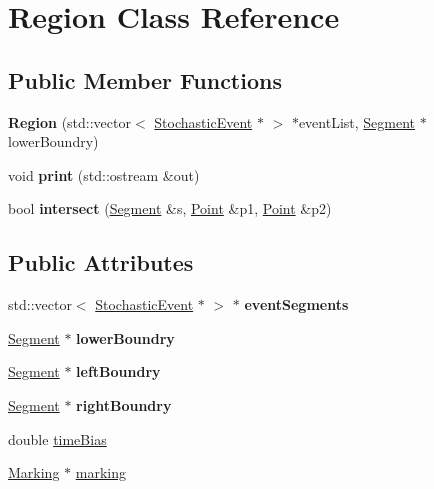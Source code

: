 \hypertarget{classRegion}{\section{Region Class Reference}
\label{classRegion}
}
\subsection*{Public Member Functions}
\begin{DoxyCompactItemize}
\item 
\hypertarget{classRegion_a41ba18a2fa719627ef1933d80876f622}{{\bfseries Region} (std\-::vector$<$ \hyperlink{structStochasticEvent}{Stochastic\-Event} $\ast$ $>$ $\ast$event\-List, \hyperlink{classSegment}{Segment} $\ast$lower\-Boundry)}\label{classRegion_a41ba18a2fa719627ef1933d80876f622}

\item 
\hypertarget{classRegion_a4b32e470e65d95d557129accb8cc5dd5}{void {\bfseries print} (std\-::ostream \&out)}\label{classRegion_a4b32e470e65d95d557129accb8cc5dd5}

\item 
\hypertarget{classRegion_a2d113c4b0cb61ceb1a469d1a8ecfbd1d}{bool {\bfseries intersect} (\hyperlink{classSegment}{Segment} \&s, \hyperlink{structPoint}{Point} \&p1, \hyperlink{structPoint}{Point} \&p2)}\label{classRegion_a2d113c4b0cb61ceb1a469d1a8ecfbd1d}

\end{DoxyCompactItemize}
\subsection*{Public Attributes}
\begin{DoxyCompactItemize}
\item 
\hypertarget{classRegion_a28c4bbed633b1e0795b75c765881152e}{std\-::vector$<$ \hyperlink{structStochasticEvent}{Stochastic\-Event} $\ast$ $>$ $\ast$ {\bfseries event\-Segments}}\label{classRegion_a28c4bbed633b1e0795b75c765881152e}

\item 
\hypertarget{classRegion_aec7eda0e18a1cc45b181e37002b43aa8}{\hyperlink{classSegment}{Segment} $\ast$ {\bfseries lower\-Boundry}}\label{classRegion_aec7eda0e18a1cc45b181e37002b43aa8}

\item 
\hypertarget{classRegion_ab67af47f2e4b0c139977abcfc5768750}{\hyperlink{classSegment}{Segment} $\ast$ {\bfseries left\-Boundry}}\label{classRegion_ab67af47f2e4b0c139977abcfc5768750}

\item 
\hypertarget{classRegion_a281bdea20d56af521f274ddd870aac9a}{\hyperlink{classSegment}{Segment} $\ast$ {\bfseries right\-Boundry}}\label{classRegion_a281bdea20d56af521f274ddd870aac9a}

\item 
double \hyperlink{classRegion_af080e4f60bc8a0231ee52d96f69f40e3}{time\-Bias}
\item 
\hyperlink{structMarking}{Marking} $\ast$ \hyperlink{classRegion_aed4910285f30a87eefaf58fd2c96c4e6}{marking}
\end{DoxyCompactItemize}


